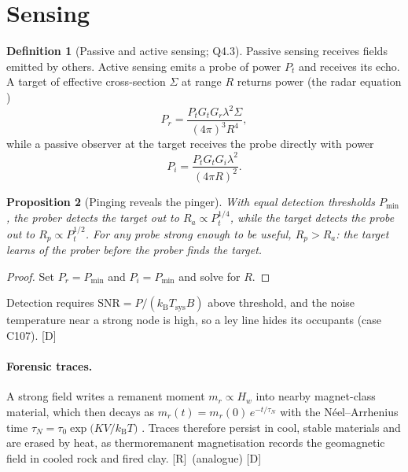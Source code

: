 \documentclass[11pt,a4paper]{article}
\numberwithin{equation}{section}
\theoremstyle{definition}
\newtheorem{definition}{Definition}[section]
\theoremstyle{plain}
\newtheorem{proposition}[definition]{Proposition}
\theoremstyle{remark}
\newcommand{\kB}{k_{\mathrm B}}
\newcommand{\tagD}{\textcolor{tag}{\textsf{[D]}}}
\newcommand{\tagR}{\textcolor{tag}{\textsf{[R]}}}
\begin{document}
\section{Sensing}\label{sec:sensing}

\begin{definition}[Passive and active sensing; Q4.3]
Passive sensing receives fields emitted by others. Active sensing emits a probe of power $P_t$ and receives its echo. A target of effective cross-section $\Sigma$ at range $R$ returns power (the radar equation \cite{skolnik})
\begin{equation}
P_r=\frac{P_tG_tG_r\lambda^2\Sigma}{(4\pi)^3R^4},
\end{equation}
while a passive observer at the target receives the probe directly with power
\begin{equation}
P_i=\frac{P_tG_tG_i\lambda^2}{(4\pi R)^2}.
\end{equation}
\end{definition}
\begin{proposition}[Pinging reveals the pinger]\label{prop:intercept}
With equal detection thresholds $P_{\min}$, the prober detects the target out to $R_a\propto P_t^{1/4}$, while the target detects the probe out to $R_p\propto P_t^{1/2}$. For any probe strong enough to be useful, $R_p>R_a$: the target learns of the prober before the prober finds the target.
\end{proposition}
\begin{proof}
Set $P_r=P_{\min}$ and $P_i=P_{\min}$ and solve for $R$.
\end{proof}
Detection requires $\mathrm{SNR}=P/(\kB T_{\text{sys}}B)$ above threshold, and the noise temperature near a strong node is high, so a ley line hides its occupants (case C107). \tagD

\paragraph{Forensic traces.} A strong field writes a remanent moment $m_r\propto H_w$ into nearby magnet-class material, which then decays as $m_r(t)=m_r(0)\,e^{-t/\tau_N}$ with the N\'eel--Arrhenius time $\tau_N=\tau_0\exp\!\big(K V/\kB T\big)$ \cite{neel}. Traces therefore persist in cool, stable materials and are erased by heat, as thermoremanent magnetisation records the geomagnetic field in cooled rock and fired clay. \tagR\ (analogue) \tagD

\end{document}
